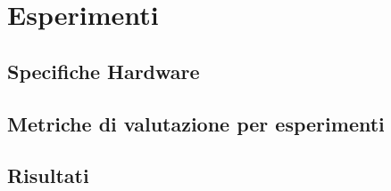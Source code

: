 \chapter{Esperimenti}\label{ch:exp}
\section{Specifiche Hardware}
\section{Metriche di valutazione per esperimenti}
\section{Risultati}
